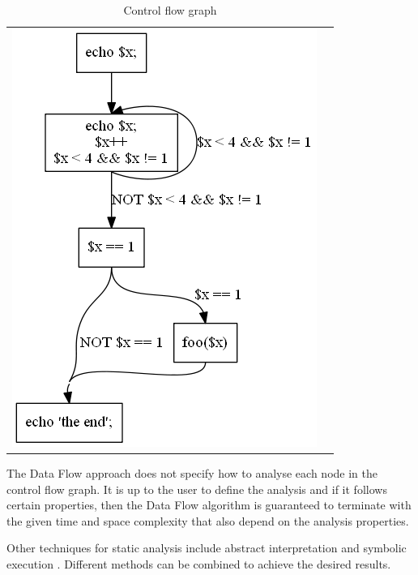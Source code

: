 \begin{table}[h]
  \begin{tabular}{ l | p }
  \centering
    \includegraphics[scale=0.7]{cfg.png}
  &
 
 
\vspace{0pt}
%
%    

  \\
  \end{tabular}
  \caption{Control flow graph\label{cfg}}  
\end{table}

The Data Flow approach does not specify how to analyse each node 
in the control flow graph. It is up to the user to define 
the analysis and if it follows certain properties, then the 
Data Flow algorithm is guaranteed to terminate with the given 
time and space complexity that also depend on the analysis properties.

Other techniques for static analysis include 
abstract interpretation \cite{cousot1977abstract} 
and symbolic execution \cite{king1976symbolic}. 
Different methods can be combined to achieve 
the desired results. 


